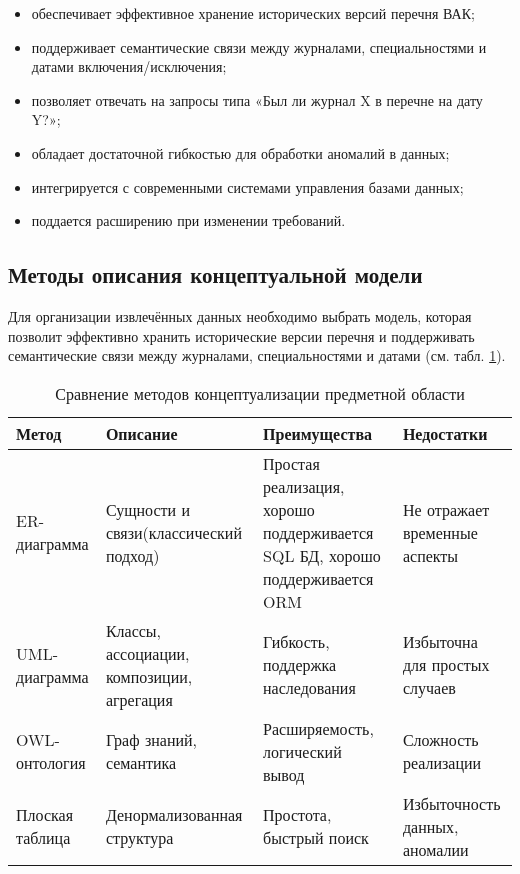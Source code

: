 \begin{itemize}
	\item обеспечивает эффективное хранение исторических версий перечня ВАК;
	\item поддерживает 
	семантические 
	связи между 
	журналами, 
	специальностями и датами включения/исключения;
	\item позволяет отвечать на запросы типа «Был ли журнал X в перечне на дату Y?»;
	\item обладает достаточной гибкостью для обработки аномалий в данных;
	\item интегрируется с современными системами управления базами данных;
	\item поддается расширению при изменении требований.
\end{itemize}


\subsection{Методы описания концептуальной модели}

Для организации извлечённых данных необходимо выбрать модель,
которая позволит эффективно хранить исторические версии перечня 
и поддерживать семантические связи между журналами, 
специальностями и датами (см. табл. \ref{tab:conceptual-model-methods}).

\begin{table}[h]
	\caption{Сравнение методов концептуализации предметной области}
	\label{tab:conceptual-model-methods}
	\centering
	\begin{tabular}{|p{}|p{}|p{}|p{}|}
		\hline
		Метод & Описание & Преимущества & Недостатки \\
		\hline
		ER-диаграмма & 
		Сущности и связи(классический подход) 
		& Простая реализация,
		хорошо поддерживается SQL БД,
		хорошо поддерживается ORM
		& Не отражает временные аспекты \\
		\hline
		UML-диаграмма 
		& Классы, ассоциации, композиции, агрегация
		& Гибкость, поддержка наследования
		& Избыточна для простых случаев \\
		\hline
		OWL-онтология & Граф знаний, семантика 
		& Расширяемость, логический вывод 
		& Сложность реализации
		\\
		\hline
		Плоская таблица 
		& Денормализованная структура 
		& Простота, быстрый поиск 
		& Избыточность данных, аномалии \\
		\hline 
	\end{tabular}
\end{table}

